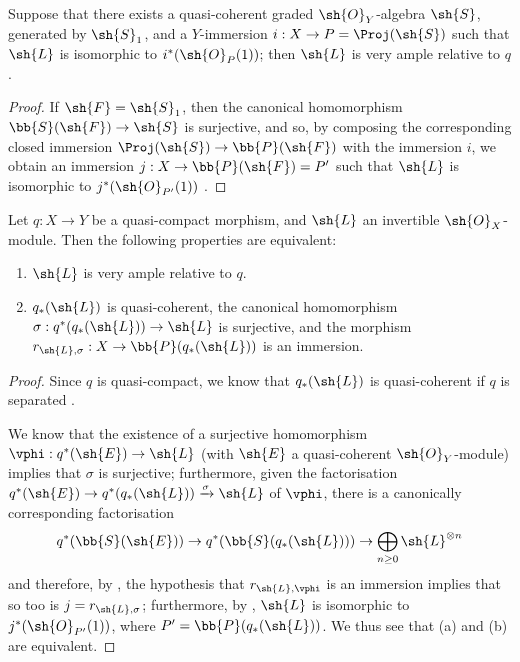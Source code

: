 \begin{corollary}[4.4.3]
\label{II.4.4.3}
Suppose that there exists a quasi-coherent graded $\sh{O}_Y$-algebra $\sh{S}$, generated by $\sh{S}_1$, and a $Y$-immersion $i:X\to P=\Proj(\sh{S})$ such that $\sh{L}$ is isomorphic to $i^*(\sh{O}_P(1))$;
then $\sh{L}$ is very ample relative to $q$.
\end{corollary}

\begin{proof}
If $\sh{F}=\sh{S}_1$, then the canonical homomorphism $\bb{S}(\sh{F})\to\sh{S}$ is surjective, and so, by composing the corresponding closed immersion $\Proj(\sh{S})\to\bb{P}(\sh{F})$  with the immersion $i$, we obtain an immersion $j:X\to\bb{P}(\sh{F})=P'$ such that $\sh{L}$ is isomorphic to $j^*(\sh{O}_{P'}(1))$ .
\end{proof}

\begin{proposition}[4.4.4]
\label{II.4.4.4}
Let $q:X\to Y$ be a quasi-compact morphism, and $\sh{L}$ an invertible $\sh{O}_X$-module.
Then the following properties are equivalent:
\begin{enumerate}
  \item[\rm{(a)}] $\sh{L}$ is very ample relative to $q$.
  \item[\rm{(b)}] $q_*(\sh{L})$ is quasi-coherent, the canonical homomorphism $\sigma:q^*(q_*(\sh{L}))\to\sh{L}$ is surjective, and the morphism $r_{\sh{L},\sigma}:X\to\bb{P}(q_*(\sh{L}))$ is an immersion.
\end{enumerate}
\end{proposition}

\begin{proof}
Since $q$ is quasi-compact, we know that $q_*(\sh{L})$ is quasi-coherent if $q$ is separated .

We know  that the existence of a surjective homomorphism $\vphi:q^*(\sh{E})\to\sh{L}$ (with $\sh{E}$ a quasi-coherent $\sh{O}_Y$-module) implies that $\sigma$ is surjective;
furthermore, given the factorisation $q^*(\sh{E})\to q^*(q_*(\sh{L}))\xrightarrow{\sigma}\sh{L}$ of $\vphi$, there is a canonically corresponding factorisation
\[
  q^*(\bb{S}(\sh{E})) \to q^*(\bb{S}(q_*(\sh{L}))) \to \bigoplus_{n\geq0}\sh{L}^{\otimes n}
\]
and therefore, by , the hypothesis that $r_{\sh{L},\vphi}$ is an immersion implies that so too is $j=r_{\sh{L},\sigma}$;
furthermore, by , $\sh{L}$ is isomorphic to $j^*(\sh{O}_{P'}(1))$, where $P'=\bb{P}(q_*(\sh{L}))$.
We thus see that (a) and (b) are equivalent.
\end{proof}

